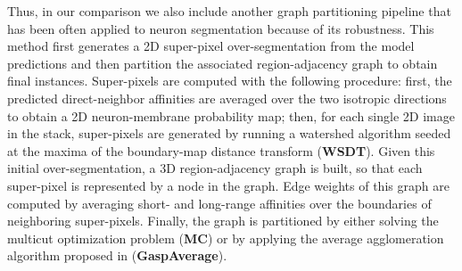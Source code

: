 Thus, in our comparison we also include another graph partitioning pipeline that has been often applied to neuron segmentation because of its robustness. This method first generates a 2D super-pixel over-segmentation from the model predictions and then partition the associated region-adjacency graph to obtain final instances. Super-pixels are computed with the following procedure: first, the predicted direct-neighbor affinities are averaged over the two isotropic directions to obtain a 2D neuron-membrane probability map; then, for each single 2D image in the stack, super-pixels are generated by running a watershed algorithm seeded at the maxima of the boundary-map distance transform (\textbf{WSDT}). Given this initial over-segmentation, a 3D region-adjacency graph is built, so that each super-pixel is represented by a node in the graph. Edge weights of this graph are computed by averaging short- and long-range affinities over the boundaries of neighboring super-pixels. 
Finally, the graph is partitioned by either solving the multicut optimization problem (\textbf{MC}) or by applying the average agglomeration algorithm proposed in \cite{bailoni2019generalized} (\textbf{GaspAverage}).


  




